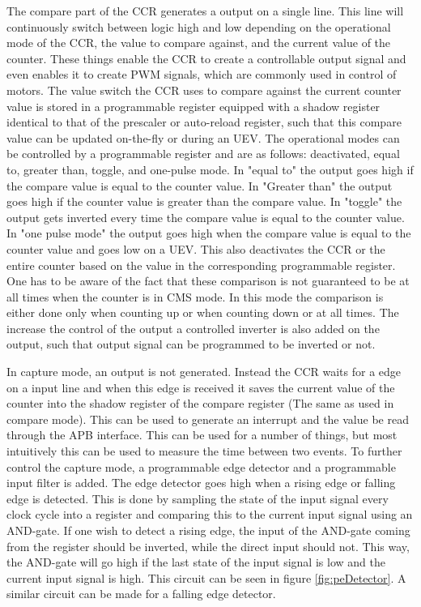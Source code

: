 \documentclass[./dissertation.tex]{subfiles}
\begin{document}
The compare part of the CCR generates a output on a single line. This line will continuously switch between logic high and low depending on the operational mode of the CCR, the value to compare against, and the current value of the counter. These things enable the CCR to create a controllable output signal and even enables it to create PWM signals, which are commonly used in control of motors. The value switch the CCR uses to compare against the current counter value is stored in a programmable register equipped with a shadow register identical to that of the prescaler or auto-reload register, such that this compare value can be updated on-the-fly or during an UEV. The operational modes can be controlled by a programmable register and are as follows: deactivated, equal to, greater than, toggle, and one-pulse mode. In "equal to" the output goes high if the compare value is equal to the counter value. In "Greater than" the output goes high if the counter value is greater than the compare value. In "toggle" the output gets inverted every time the compare value is equal to the counter value. In "one pulse mode" the output goes high when the compare value is equal to the counter value and goes low on a UEV. This also deactivates the CCR or the entire counter based on the value in the corresponding programmable register. One has to be aware of the fact that these comparison is not guaranteed to be at all times when the counter is in CMS mode. In this mode the comparison is either done only when counting up or when counting down or at all times. The increase the control of the output a controlled inverter is also added on the output, such that output signal can be programmed to be inverted or not. 

In capture mode, an output is not generated. Instead the CCR waits for a edge on a input line and when this edge is received it saves the current value of the counter into the shadow register of the compare register (The same as used in compare mode). This can be used to generate an interrupt and the value be read through the APB interface. This can be used for a number of things, but most intuitively this can be used to measure the time between two events. To further control the capture mode, a programmable edge detector and a programmable input filter is added. The edge detector goes high when a rising edge or falling edge is detected. This is done by sampling the state of the input signal every clock cycle into a register and comparing this to the current input signal using an AND-gate. If one wish to detect a rising edge, the input of the AND-gate coming from the register should be inverted, while the direct input should not. This way, the AND-gate will go high if the last state of the input signal is low and the current input signal is high. This circuit can be seen in figure \ref{fig:peDetector}. A similar circuit can be made for a falling edge detector. 
\end{document}
